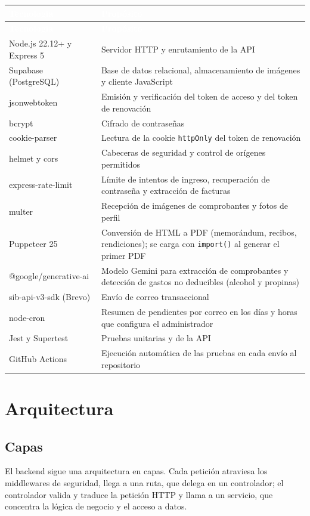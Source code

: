 \documentclass[11pt,letterpaper]{article}
\newcommand{\cabecera}{\rowcolor{maxamPrimario}}
\newcommand{\tth}[1]{\textcolor{white}{\textbf{#1}}}
\newcommand{\code}[1]{\nolinkurl{#1}}
\begin{document}
\begin{xltabular}{\textwidth}{L{4.2cm} Y}
\cabecera \tth{Tecnología} & \tth{Propósito} \\
\endfirsthead
\cabecera \tth{Tecnología} & \tth{Propósito} \\
\endhead
{} Node.js 22.12+ y Express 5 & Servidor HTTP y enrutamiento de la API \\
Supabase (PostgreSQL) & Base de datos relacional, almacenamiento de imágenes y cliente JavaScript \\
 jsonwebtoken & Emisión y verificación del token de acceso y del token de renovación \\
bcrypt & Cifrado de contraseñas \\
 cookie-parser & Lectura de la cookie \code{httpOnly} del token de renovación \\
helmet y cors & Cabeceras de seguridad y control de orígenes permitidos \\
 express-rate-limit & Límite de intentos de ingreso, recuperación de contraseña y extracción de facturas \\
multer & Recepción de imágenes de comprobantes y fotos de perfil \\
 Puppeteer 25 & Conversión de HTML a PDF (memorándum, recibos, rendiciones); se carga con \code{import()} al generar el primer PDF \\
@google/generative-ai & Modelo Gemini para extracción de comprobantes y detección de gastos no deducibles (alcohol y propinas) \\
 sib-api-v3-sdk (Brevo) & Envío de correo transaccional \\
node-cron & Resumen de pendientes por correo en los días y horas que configura el administrador \\
 Jest y Supertest & Pruebas unitarias y de la API \\
GitHub Actions & Ejecución automática de las pruebas en cada envío al repositorio \\
\end{xltabular}

\section{Arquitectura}

\subsection{Capas}
El backend sigue una arquitectura en capas. Cada petición atraviesa los middlewares de seguridad, llega a una ruta, que delega en un controlador; el controlador valida y traduce la petición HTTP y llama a un servicio, que concentra la lógica de negocio y el acceso a datos.
\end{document}
